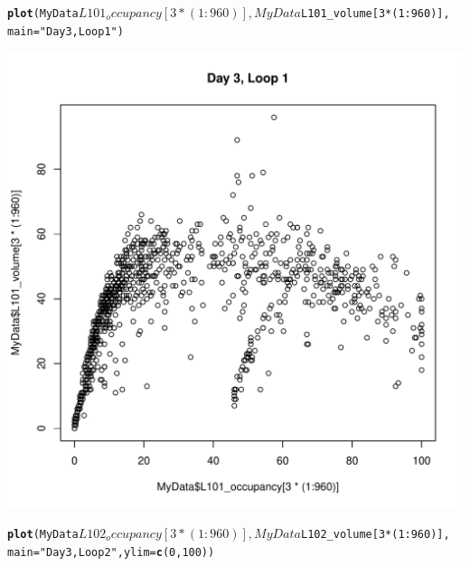 \documentclass[review, authoryear]{elsarticle}\usepackage{graphicx, color}
\makeatletter
\def\maxwidth{ %
  \ifdim\Gin@nat@width>\linewidth
    \linewidth
  \else
    \Gin@nat@width
  \fi
}
\newcommand{\hlfunctioncall}[1]{\textcolor[rgb]{0.501960784313725,0,0.329411764705882}{\textbf{#1}}}%
\newcommand{\hlstring}[1]{\textcolor[rgb]{0.6,0.6,1}{#1}}%
\newenvironment{kframe}{%
 \def\at@end@of@kframe{}%
 \ifinner\ifhmode%
  \def\at@end@of@kframe{\end{minipage}}%
  \begin{minipage}{\columnwidth}%
 \fi\fi%
 \def\FrameCommand##1{\hskip\@totalleftmargin \hskip-\fboxsep
 \colorbox{shadecolor}{##1}\hskip-\fboxsep
     \hskip-\linewidth \hskip-\@totalleftmargin \hskip\columnwidth}%
 \MakeFramed {\advance\hsize-\width
   \@totalleftmargin\z@ \linewidth\hsize
   \@setminipage}}%
 {\par\unskip\endMakeFramed%
 \at@end@of@kframe}
\newenvironment{knitrout}{}{} %
\makeatother
\begin{document}
\begin{knitrout}
\color{fgcolor}\begin{kframe}
\begin{alltt}
\hlfunctioncall{plot}(MyData$L101_occupancy[3 * (1:960)], MyData$L101_volume[3 * (1:960)], 
    main = \hlstring{"Day 3, Loop 1"})
\end{alltt}
\end{kframe}\includegraphics[width=\maxwidth]{figure/unnamed-chunk-11} \begin{kframe}\begin{alltt}
\hlfunctioncall{plot}(MyData$L102_occupancy[3 * (1:960)], MyData$L102_volume[3 * (1:960)], 
    main = \hlstring{"Day 3, Loop 2"}, ylim = \hlfunctioncall{c}(0, 100))
\end{alltt}

\end{kframe}
\end{knitrout}
\end{document}
